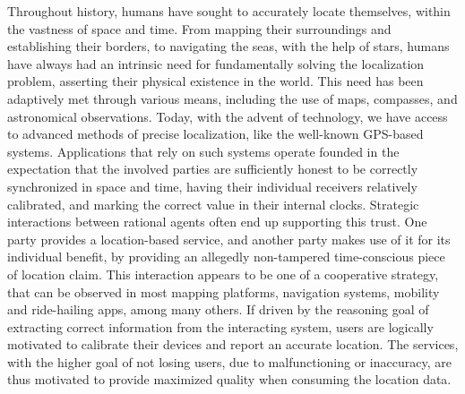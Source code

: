 

Throughout history, humans have sought to accurately locate themselves, within the vastness of space and time. From mapping their surroundings and establishing their borders, to navigating the seas, with the help of stars, humans have always had an intrinsic need for fundamentally solving the localization problem, asserting their physical existence in the world. This need has been adaptively met through various means, including the use of maps, compasses, and astronomical observations. Today, with the advent of technology, we have access to advanced methods of precise localization, like the well-known GPS-based systems. Applications that rely on such systems operate founded in the expectation that the involved parties are sufficiently honest to be correctly synchronized in space and time, having their individual receivers relatively calibrated, and marking the correct value in their internal clocks. Strategic interactions between rational agents often end up supporting this trust. One party provides a location-based service, and another party makes use of it for its individual benefit, by providing an allegedly non-tampered time-conscious piece of location claim. This interaction appears to be one of a cooperative strategy, that can be observed in most mapping platforms, navigation systems, mobility and ride-hailing apps, among many others. If driven by the reasoning goal of extracting correct information from the interacting system, users are logically motivated to calibrate their devices and report an accurate location. The services, with the higher goal of not losing users, due to malfunctioning or inaccuracy, are thus motivated to provide maximized quality when consuming the location data. 

